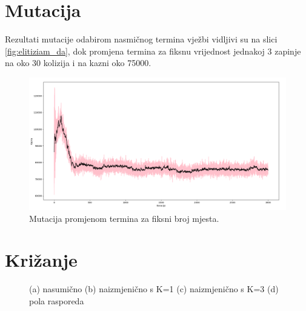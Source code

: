 \documentclass[times, utf8, zavrsni]{fer}
\begin{document}
\section{Mutacija}

Rezultati mutacije odabirom nasmičnog termina vježbi vidljivi su na slici \ref{fig:elitiziam_da}, dok promjena termina za fiksnu vrijednost jednakoj 3 zapinje na oko 30 kolizija i na kazni oko 75000.

\begin{figure}[htb]
\centering
\includegraphics[width=15cm]{images/plus_tri.png}
\caption{Mutacija promjenom termina za fiksni broj mjesta.}
\label{fig:plus_tri}
\end{figure}

\section{Križanje}

\begin{figure}[htb]
    \centering
    \caption{(a) nasumično (b) naizmjenično s K=1 (c) naizmjenično s K=3 (d) pola rasporeda}
    \label{fig:krizanja}
\end{figure}
\end{document}
